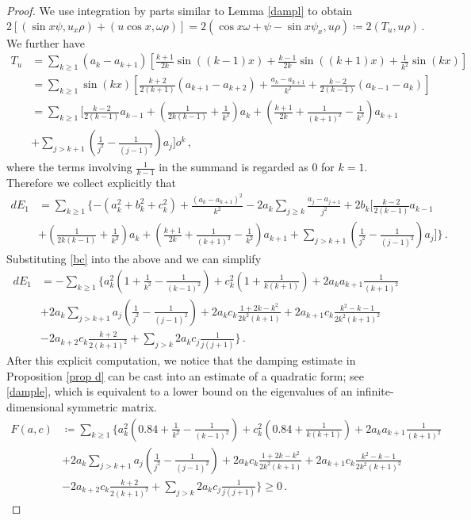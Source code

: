 \documentclass[12pt]{caltech_thesis}
\numberwithin{equation}{section}
\begin{document}
\begin{proof}
We use integration by parts similar to Lemma \ref{dampl} to obtain 
$$2[(\sin x\psi,u_x\rho)+ (u \cos{x},\omega \rho)]=2(\cos{x}\omega+\psi-\sin x\psi_x,u\rho)\coloneqq2(T_u,u\rho)\,.$$
We further have $$\begin{aligned}
T_u&=\sum_{k \geq 1} (a_k-a_{k+1})[\frac{k+1}{2k}\sin((k-1)x)+\frac{k-1}{2k}\sin((k+1)x)+\frac{1}{k^2}\sin(kx)]\\&=\sum_{k \geq 1} \sin(kx) [\frac{k+2}{2(k+1)}(a_{k+1}-a_{k+2})+\frac{a_{k}-a_{k+1}}{k^2}+\frac{k-2}{2(k-1)}(a_{k-1}-a_{k})]\\&=\sum_{k\geq 1}[\frac{k-2}{2(k-1)}a_{k-1}+(\frac{1}{2k(k-1)}+\frac{1}{k^2})a_{k}+(\frac{k+1}{2k}+\frac{1}{(k+1)^2}-\frac{1}{k^2})a_{k+1}\\&+\sum_{j>k+1}(\frac{1}{j^2}-\frac{1}{(j-1)^2})a_j]o^k\,,  
\end{aligned}$$
where the terms involving $\frac{1}{k-1}$ in the summand is regarded as $0$ for $k=1$. Therefore we collect explicitly that 
$$\begin{aligned}
dE_1&=\sum_{k\geq 1}\{ -(a_k^2+b_k^2+c_k^2)+ \frac{(a_k-a_{k+1})^2}{k^2}-2 a_k\sum_{j\geq k}\frac{a_j-a_{j+1}}{j^2}+2b_k[\frac{k-2}{2(k-1)}a_{k-1}\\&+(\frac{1}{2k(k-1)}+\frac{1}{k^2})a_{k}+(\frac{k+1}{2k}+\frac{1}{(k+1)^2}-\frac{1}{k^2})a_{k+1}+\sum_{j>k+1}(\frac{1}{j^2}-\frac{1}{(j-1)^2})a_j]\}\,.\end{aligned}$$
Substituting \eqref{bc} into the above and we can simplify
$$
\begin{aligned}
dE_1&=-\sum_{k \geq 1}\{ a_k^2(1+\frac{1}{k^2}-\frac{1}{(k-1)^2})+c_k^2(1+\frac{1}{k(k+1)})+ 2a_k a_{k+1}\frac{1}{(k+1)^2}\\&+2 a_k \sum_{j>k+1}a_j(\frac{1}{j^2}-\frac{1}{(j-1)^2})+2a_kc_k\frac{1+2k-k^2}{2k^2(k+1)}+2a_{k+1}c_k\frac{k^2-k-1}{2k^2(k+1)^2}\\&-2a_{k+2}c_k\frac{k+2}{2(k+1)^2}+\sum_{j>k}2a_k c_j\frac{1}{j(j+1)}\}\,.\end{aligned}$$
After this explicit computation, we notice that the damping estimate in Proposition \ref{prop d} can be cast into an estimate of a quadratic form; see \eqref{dample}, which is equivalent to a lower bound on the eigenvalues of an infinite-dimensional symmetric matrix. 
\begin{equation}
    \label{dample}\begin{aligned}
 F(a,c)&\coloneqq \sum_{k\geq1}\{ a_k^2(0.84+\frac{1}{k^2}-\frac{1}{(k-1)^2})+c_k^2(0.84+\frac{1}{k(k+1)})+ 2a_k a_{k+1}\frac{1}{(k+1)^2}\\&+2 a_k \sum_{j>k+1}a_j(\frac{1}{j^2}-\frac{1}{(j-1)^2})+2a_kc_k\frac{1+2k-k^2}{2k^2(k+1)}+2a_{k+1}c_k\frac{k^2-k-1}{2k^2(k+1)^2}\\&-2a_{k+2}c_k\frac{k+2}{2(k+1)^2}+\sum_{j>k}2a_k c_j\frac{1}{j(j+1)}\}\geq0\,.\end{aligned}\end{equation}


\end{proof}
\end{document}
